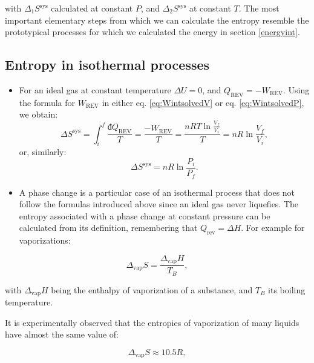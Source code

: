 \documentclass[
  9pt,
]{extbook}
\theoremstyle{definition}
\theoremstyle{definition}
\theoremstyle{definition}
\theoremstyle{remark}
\begin{document}
with \(\Delta_1 S^{\text{sys}}\) calculated at constant \(P\), and \(\Delta_2 S^{\text{sys}}\) at constant \(T\). The most important elementary steps from which we can calculate the entropy resemble the prototypical processes for which we calculated the energy in section \ref{energyint}.

\hypertarget{entropy-in-isothermal-processes}{%
\subsection{Entropy in isothermal processes}\label{entropy-in-isothermal-processes}}

\begin{itemize}
\item
  For an ideal gas at constant temperature \(\Delta U =0\), and \(Q_{\mathrm{REV}} = -W_{\mathrm{REV}}\). Using the formula for \(W_{\mathrm{REV}}\) in either eq. \eqref{eq:WintsolvedV} or eq. \eqref{eq:WintsolvedP}, we obtain:
  \begin{equation}
  \Delta S^{\mathrm{sys}} = \int_i^f \frac{đQ_{\mathrm{REV}}}{T} = \frac{-W_{\mathrm{REV}}}{T} = \frac{nRT \ln \frac{V_f}{V_i}}{T} = nR \ln \frac{V_f}{V_i},
  \label{eq:sigconsttV}
  \end{equation}
  or, similarly:
  \begin{equation}
  \Delta S^{\mathrm{sys}} = nR \ln \frac{P_i}{P_f}.
  \label{eq:sigconsttP}
  \end{equation}
\item
  A phase change is a particular case of an isothermal process that does not follow the formulas introduced above since an ideal gas never liquefies. The entropy associated with a phase change at constant pressure can be calculated from its definition, remembering that \(Q_{\mathrm{rev}}= \Delta H\). For example for vaporizations:
\end{itemize}

\begin{equation}
\Delta_{\mathrm{vap}} S = \frac{\Delta_{\mathrm{vap}}H}{T_B},
\label{eq:spc}
\end{equation}

with \(\Delta_{\mathrm{vap}}H\) being the enthalpy of vaporization of a substance, and \(T_B\) its boiling temperature.

It is experimentally observed that the entropies of vaporization of many liquids have almost the same value of:

\begin{equation}
\Delta_{\mathrm{vap}} S \approx 10.5 R,
\label{eq:trouton}
\end{equation}
\end{document}
